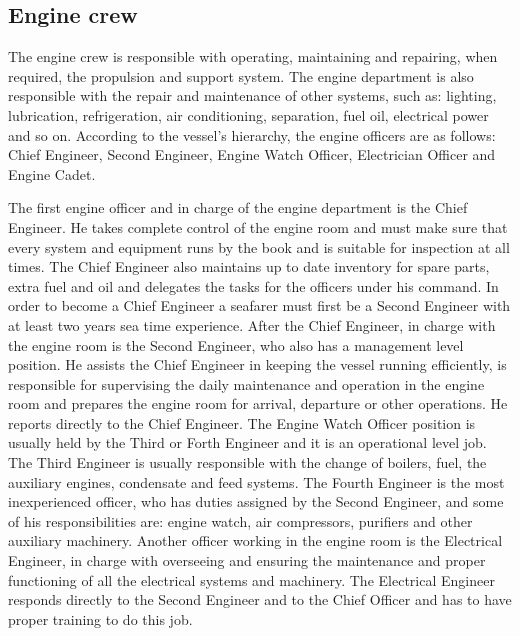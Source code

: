 \subsection{Engine crew}
The engine crew is responsible with operating, maintaining and repairing, when required, the propulsion and support system. The engine department is also responsible with the repair and maintenance of other systems, such as: lighting, lubrication, refrigeration, air conditioning, separation, fuel oil, electrical power and so on.
According to the vessel’s hierarchy, the engine officers are as follows: Chief Engineer, Second Engineer, Engine Watch Officer, Electrician Officer and Engine Cadet.

The first engine officer and in charge of the engine department is the Chief Engineer. He takes complete control of the engine room and must make sure that every system and equipment runs by the book and is suitable for inspection at all times. The Chief Engineer also maintains up to date inventory for spare parts, extra fuel and oil and delegates the tasks for the officers under his command. In order to become a Chief Engineer a seafarer must first be a Second Engineer with at least two years sea time experience.
After the Chief Engineer, in charge with the engine room is the Second Engineer, who also has a management level position. He assists the Chief Engineer in keeping the vessel running efficiently, is responsible for supervising the daily maintenance and operation in the engine room and prepares the engine room for arrival, departure or other operations. He reports directly to the Chief Engineer.
The Engine Watch Officer position is usually held by the Third or Forth Engineer and it is an operational level job. The Third Engineer is usually responsible with the change of boilers, fuel, the auxiliary engines, condensate and feed systems. The Fourth Engineer is the most inexperienced officer, who has duties assigned by the Second Engineer, and some of his responsibilities are: engine watch, air compressors, purifiers and other auxiliary machinery.
Another officer working in the engine room is the Electrical Engineer, in charge with overseeing and ensuring the maintenance and proper functioning of all the electrical systems and machinery. The Electrical Engineer responds directly to the Second Engineer and to the Chief Officer and has to have proper training to do this job.

